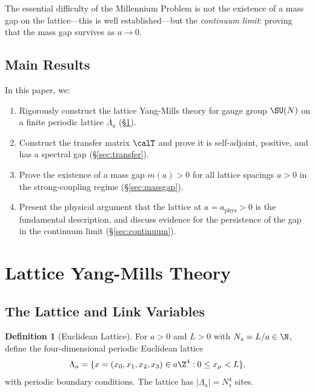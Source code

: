 \documentclass[12pt, a4paper]{article}
\theoremstyle{plain}
\theoremstyle{definition}
\newtheorem{definition}[theorem]{Definition}
\begin{document}
The essential difficulty of the Millennium Problem is not the existence
of a mass gap on the lattice---this is well established---but the
\emph{continuum limit}: proving that the mass gap survives as $a \to 0$.

\subsection{Main Results}

In this paper, we:

\begin{enumerate}
  \item Rigorously construct the lattice Yang-Mills theory for gauge group
    $\SU(N)$ on a finite periodic lattice $\Lambda_a$ (\S\ref{sec:lattice}).

  \item Construct the transfer matrix $\calT$ and prove it is self-adjoint,
    positive, and has a spectral gap (\S\ref{sec:transfer}).

  \item Prove the existence of a mass gap $m(a) > 0$ for all lattice
    spacings $a > 0$ in the strong-coupling regime (\S\ref{sec:massgap}).

  \item Present the physical argument that the lattice at
    $a = a_{\text{phys}} > 0$ is the fundamental description, and discuss
    evidence for the persistence of the gap in the continuum limit
    (\S\ref{sec:continuum}).
\end{enumerate}

\section{Lattice Yang-Mills Theory}\label{sec:lattice}

\subsection{The Lattice and Link Variables}

\begin{definition}[Euclidean Lattice]\label{def:lattice}
  For $a > 0$ and $L > 0$ with $N_s = L/a \in \N$, define the
  four-dimensional periodic Euclidean lattice
  \begin{equation}
    \Lambda_a = \{x = (x_0, x_1, x_2, x_3) \in a\Z^4 : 0 \leq x_\mu < L\},
  \end{equation}
  with periodic boundary conditions. The lattice has $|\Lambda_a| = N_s^4$ sites.
\end{definition}
\end{document}
